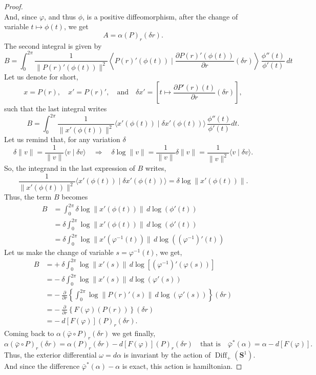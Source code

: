 \documentclass[10pt,reqno,twoside]{amsart}
\DeclareMathOperator{\Diff}{Diff}
\theoremstyle{plain}
\theoremstyle{definition}
\begin{document}
\begin{proof}
\[    \]
    And,
    since $\varphi$,
    and thus $\phi$,
    is a positive diffeomorphism,
    after the change of variable $t \mapsto \phi(t)$,
    we get
    \[
    A = \alpha(P)_r(\delta r).
    \]
    The second integral is given by
    \[
    B = \int_0^{2\pi} \frac{1}{\lVert P(r)'(\phi(t))\rVert^2} \left\langle P(r)'(\phi(t)) \mid \frac{\partial P(r)'(\phi(t))}{\partial r}(\delta r) \right\rangle \, \frac{\phi''(t)}{\phi'(t)} \, dt
    \]
    Let us denote for short,
    \[
    x = P(r), \quad x' = P(r)', \quad\text{and}\quad \delta x' = \left[t \mapsto \frac{\partial P'(r)(t)}{\partial r}(\delta r) \right],
    \]
    such that the last integral writes
    \[
    B = \int_0^{2\pi} \frac{1}{\lVert x'(\phi(t))\rVert^2} \langle x'(\phi(t)) \mid \delta x'(\phi(t)) \rangle \, \frac{\phi''(t)}{\phi'(t)} dt.
    \]
    Let us remind that,
    for any variation $\delta$
    \[
    \delta \lVert v\rVert = \frac{1}{\lVert v\rVert} \langle v \mid \delta v \rangle \quad \Rightarrow \quad \delta \log\lVert v\rVert = \frac{1}{\lVert v\rVert} \delta \lVert v\rVert = \frac{1}{\lVert v\rVert^2} \langle v \mid \delta v \rangle.
    \]
    So,
    the integrand in the last expression of $B$ writes,
    \[
    \frac{1}{\lVert x'(\phi(t))\rVert^2} \langle x'(\phi(t)) \mid \delta x'(\phi(t)) \rangle = \delta \log \lVert x'(\phi(t))\rVert.
    \]
    Thus,
    the term $B$ becomes
    \begin{align*}
      {B} & = \int_0^{2\pi} \delta \log \lVert x'(\phi(t))\rVert \, d\log(\phi'(t)) \\
      & = \delta \int_0^{2\pi} \log \lVert x'(\phi(t))\rVert \, d\log(\phi'(t)) \\
      & = \delta \int_0^{2\pi} \log \lVert x'(\varphi^{-1}(t))\rVert \, d\log((\varphi^{-1})'(t))
    \end{align*}
    Let us make the change of variable $s = \varphi^{-1}(t)$,
    we get,
    \begin{align*}
      {B} & = + \ \delta \int_0^{2\pi} \log \lVert x'(s)\rVert \, d\log[(\varphi^{-1})'(\varphi(s))] \\
      & = - \ \delta \int_0^{2\pi} \log \lVert x'(s)\rVert \, d\log(\varphi'(s)) \\
      & = - \ \frac{\partial}{\partial r}\left\{ \int_0^{2\pi} \log \lVert P(r)'(s)\rVert \, d \log(\varphi'(s)) \right\} (\delta r) \\
      & = - \ \frac{\partial}{\partial r} \left\{ F(\varphi)(P(r)) \right\} (\delta r) \\
      & = - \ d[F(\varphi)](P)_r(\delta r).
    \end{align*}
    Coming back to $\alpha(\bar{\varphi} \circ P)_r(\delta r)$ we get finally,
    \[
    \alpha(\bar{\varphi} \circ P)_r(\delta r) = \alpha(P)_r(\delta r) - d[F(\varphi)](P)_r(\delta r) \quad \text{that is} \quad \bar{\varphi}^*(\alpha) = \alpha - d[F(\varphi)].
    \]
    Thus,
    the exterior differential $\omega = d\alpha$ is invariant by the action of $\Diff_+({\mathbf{S}}^1)$.
    And since the difference $\bar{\varphi}^*(\alpha) - \alpha$ is exact,
    this action is hamiltonian.
    

\end{proof}
\end{document}
